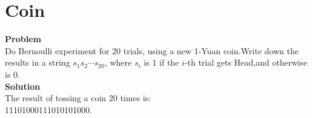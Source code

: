 	\section{Coin}
	\textbf{Problem}\\
	Do Bernoulli experiment for 20 trials, using a new 1-Yuan coin.Write down the results in a string $s_1 s_2 \cdots s_{20}$, where $s_i$ is 1 if the $i$-th trial gets Head,and otherwise is 0.
	\\
	\textbf{Solution}\\
	The result of tossing a coin 20 times is:\\11101000111010101000.
	

